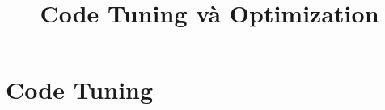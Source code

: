 \documentclass{article}
\title{Code Tuning và Optimization}
\begin{document}
    \section{Code Tuning}
\end{document}
